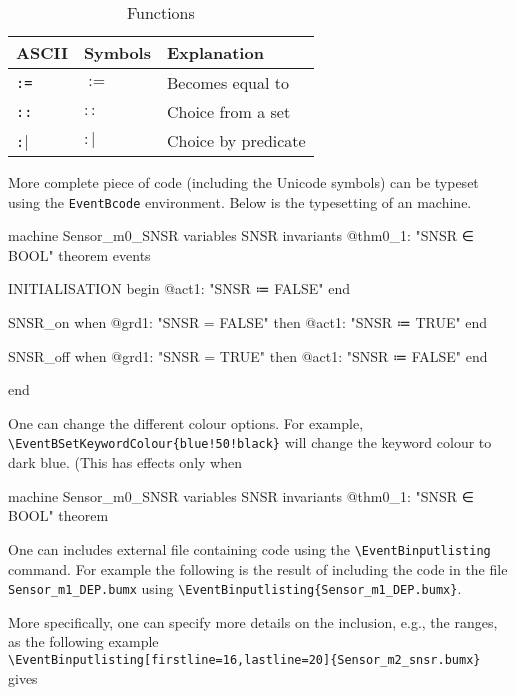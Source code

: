 \begin{table}[!htbp]
  \centering
  \begin{tabular}{|l|l|l|}
    \hline
    ASCII & Symbols & Explanation \\
    \hline
    \verb|:=| & $:=$ & Becomes equal to \\
    \verb|::| & $::$ & Choice from a set  \\
    \verb|:|| & $:|$ & Choice by predicate \\
    \hline
  \end{tabular}
  \caption{Functions}
\end{table}
 
More complete piece of code (including the Unicode symbols) can be typeset using the \verb|EventBcode| environment. Below is the typesetting of an \EventB machine.
\begin{EventBcode}
machine Sensor_m0_SNSR
variables
	SNSR
invariants
	@thm0_1: "SNSR ∈ BOOL" theorem
events

	INITIALISATION
	begin
		@act1: "SNSR ≔ FALSE"
	end

	SNSR_on
	when
		@grd1: "SNSR = FALSE"
	then
		@act1: "SNSR ≔ TRUE"
	end

	SNSR_off
	when
		@grd1: "SNSR = TRUE"
	then
		@act1: "SNSR ≔ FALSE"
	end

end
\end{EventBcode}

One can change the different colour options.  For example, \verb|\EventBSetKeywordColour{blue!50!black}| will change the keyword colour to dark blue. (This has effects only when 
\begin{EventBcode}
machine Sensor_m0_SNSR
variables
	SNSR
invariants
	@thm0_1: "SNSR ∈ BOOL" theorem
\end{EventBcode}

One can includes external file containing \EventB code using the \verb|\EventBinputlisting| command.  For example the following is the result of including the code in the file \verb|Sensor_m1_DEP.bumx| using \verb|\EventBinputlisting{Sensor_m1_DEP.bumx}|.

More specifically, one can specify more details on the inclusion, e.g., the ranges, as the following example\\
\verb|\EventBinputlisting[firstline=16,lastline=20]{Sensor_m2_snsr.bumx}|
gives



